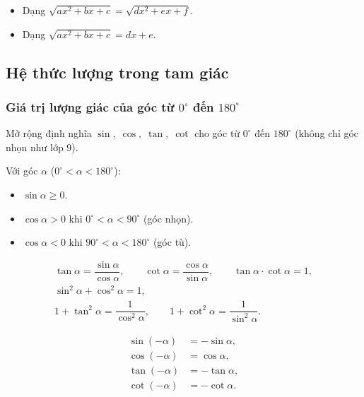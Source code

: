 \documentclass[12pt,a4paper]{article}
\begin{document}
\begin{phuongphap}
  \begin{itemize}
    \item Dạng $\sqrt{ax^2 + bx + c} = \sqrt{dx^2 + ex + f}$.
    \item Dạng $\sqrt{ax^2 + bx + c} = dx + e$.
  \end{itemize}
\end{phuongphap}

\subsection{Hệ thức lượng trong tam giác}

\subsubsection{Giá trị lượng giác của góc từ $0^\circ$ đến $180^\circ$}

\begin{dinhnghia}
  Mở rộng định nghĩa $\sin,\; \cos,\; \tan,\; \cot$ cho góc từ $0^\circ$ đến $180^\circ$ (không chỉ góc nhọn như lớp 9).

  Với góc $\alpha$ ($0^\circ < \alpha < 180^\circ$):
  \begin{itemize}
    \item $\sin\alpha \ge 0$.
    \item $\cos\alpha > 0$ khi $0^\circ < \alpha < 90^\circ$ (góc nhọn).
    \item $\cos\alpha < 0$ khi $90^\circ < \alpha < 180^\circ$ (góc tù).
  \end{itemize}
\end{dinhnghia}

\begin{congthuc}[title={Hệ thức lượng giác cơ bản}]
  \begin{gather}
    \tan\alpha = \dfrac{\sin\alpha}{\cos\alpha},\qquad
    \cot\alpha = \dfrac{\cos\alpha}{\sin\alpha},\qquad
    \tan\alpha \cdot \cot\alpha = 1, \\[4pt]
    \sin^2\alpha + \cos^2\alpha = 1, \\[4pt]
    1 + \tan^2\alpha = \dfrac{1}{\cos^2\alpha},\qquad
    1 + \cot^2\alpha = \dfrac{1}{\sin^2\alpha}.
  \end{gather}
\end{congthuc}

\begin{congthuc}[title={Góc đối nhau (cos - đối)}]
  \begin{align}
    \sin(- \alpha) &= -\sin\alpha, \\
    \cos(- \alpha) &= \cos\alpha, \\
    \tan(- \alpha) &= -\tan\alpha, \\
    \cot(- \alpha) &= -\cot\alpha.
  \end{align}
\end{congthuc}
\end{document}

